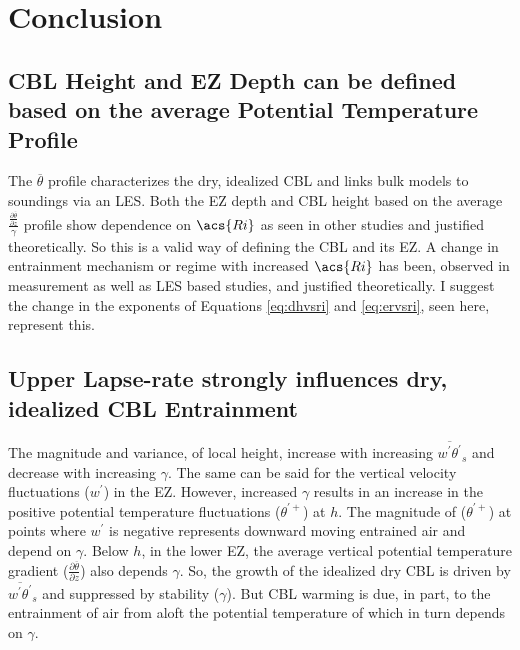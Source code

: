 \section{Conclusion}

\subsection{\acs{CBL} Height and \acs{EZ} Depth can be defined based on the average Potential Temperature Profile}

The $\overline{\theta}$ profile characterizes the dry, idealized \acs{CBL} and links bulk models to soundings via an \acs{LES}.  Both the \acs{EZ} depth and \acs{CBL} height based on the average $\frac{\frac{\partial \overline{\theta}}{\partial z}}{\gamma}$ profile show dependence on $\acs{Ri}$ as seen in other studies and justified theoretically.  So this is a valid way of defining the \acs{CBL} and its \acs{EZ}.  A change in entrainment mechanism or regime with increased $\acs{Ri}$ has been, observed in measurement as well as \acs{LES} based studies, and justified theoretically. I suggest the change in the exponents of Equations \ref{eq:dhvsri} and \ref{eq:ervsri}, seen here, represent this.\\

\subsection{Upper Lapse-rate strongly influences dry, idealized \acs{CBL} Entrainment}

The magnitude and variance, of local height, increase with increasing $\overline{w^{'}\theta^{'}}_{s}$ and decrease with increasing $\gamma$.  The same can be said for the vertical velocity fluctuations ($w^{'}$) in the \acs{EZ}.  However, increased $\gamma$ results in an increase in the positive potential temperature fluctuations ($\theta^{'+}$) at $h$. The magnitude of ($\theta^{'+}$) at points where $w^{'}$ is negative represents downward moving entrained air and depend on $\gamma$.  Below $h$, in the lower \acs{EZ}, the average vertical potential temperature gradient ($\frac{\partial \overline{\theta}}{\partial z}$) also depends $\gamma$. So, the growth of the idealized dry \acs{CBL} is driven by $\overline{w^{'}\theta^{'}}_{s}$ and suppressed by stability ($\gamma$). But \acs{CBL} warming is due, in part, to the entrainment of air from aloft the potential temperature of which in turn depends on $\gamma$.\\

